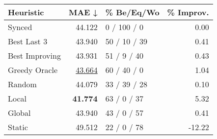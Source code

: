 \begin{tabular}{lrlr}
\toprule
\textbf{Heuristic} & \textbf{MAE ↓} & \textbf{\% Be/Eq/Wo} & \textbf{\% Improv.} \\
\midrule
            Synced &         44.122 &          0 / 100 / 0 &                0.00 \\
\midrule
       Best Last 3 &         43.940 &         50 / 10 / 39 &                0.41 \\
    Best Improving &         43.931 &          51 / 9 / 40 &                0.43 \\
\addlinespace
     Greedy Oracle &         \underline{43.664} &          60 / 40 / 0 &                1.04 \\
            Random &         44.079 &         33 / 39 / 28 &                0.10 \\
\midrule
             Local &         \textbf{41.774} &          63 / 0 / 37 &                5.32 \\
            Global &         43.940 &          43 / 0 / 57 &                0.41 \\
\midrule
            Static &         49.512 &          22 / 0 / 78 &              -12.22 \\
\bottomrule
\end{tabular}

\label{tab:non_lr01_le2_bs4_Summary}
